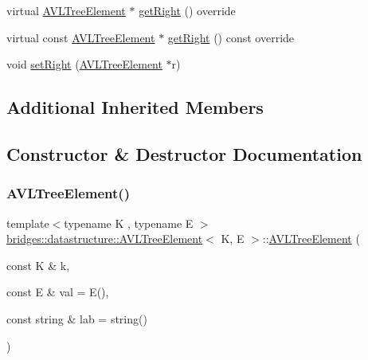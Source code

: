 \begin{DoxyCompactItemize}
\item 
virtual \hyperlink{classbridges_1_1datastructure_1_1_a_v_l_tree_element}{A\+V\+L\+Tree\+Element} $\ast$ \hyperlink{classbridges_1_1datastructure_1_1_a_v_l_tree_element_aed585fdf56fcbfebac6cd0262c9c1807}{get\+Right} () override
\item 
virtual const \hyperlink{classbridges_1_1datastructure_1_1_a_v_l_tree_element}{A\+V\+L\+Tree\+Element} $\ast$ \hyperlink{classbridges_1_1datastructure_1_1_a_v_l_tree_element_a5a2c4b96b51da1daa3c0426882250acb}{get\+Right} () const override
\item 
void \hyperlink{classbridges_1_1datastructure_1_1_a_v_l_tree_element_a8ef25fb87bcce418541adccb17cbee80}{set\+Right} (\hyperlink{classbridges_1_1datastructure_1_1_a_v_l_tree_element}{A\+V\+L\+Tree\+Element} $\ast$r)
\end{DoxyCompactItemize}
\subsection*{Additional Inherited Members}


\subsection{Constructor \& Destructor Documentation}
\mbox{\label{classbridges_1_1datastructure_1_1_a_v_l_tree_element_a611fc818eeb478e330ef585adcefd9e6}} 
\subsubsection{\texorpdfstring{A\+V\+L\+Tree\+Element()}{AVLTreeElement()}}
{\footnotesize\ttfamily template$<$typename K , typename E $>$ \\
\hyperlink{classbridges_1_1datastructure_1_1_a_v_l_tree_element}{bridges\+::datastructure\+::\+A\+V\+L\+Tree\+Element}$<$ K, E $>$\+::\hyperlink{classbridges_1_1datastructure_1_1_a_v_l_tree_element}{A\+V\+L\+Tree\+Element} (\begin{DoxyParamCaption}\item[{const K \&}]{k,  }\item[{const E \&}]{val = {\ttfamily E()},  }\item[{const string \&}]{lab = {\ttfamily string()} }\end{DoxyParamCaption})\hspace{0.3cm}{\ttfamily [inline]}}

